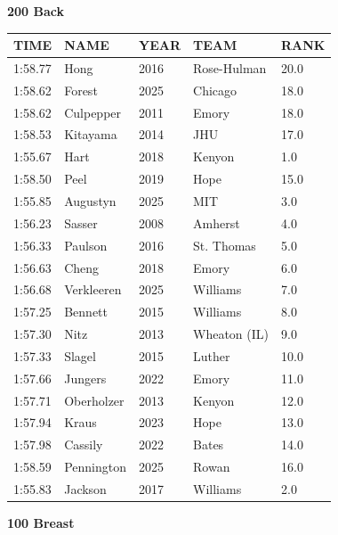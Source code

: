 \begin{table}[H]
\centering
\begin{minipage}[t]{0.48\textwidth}
\centering
\textbf{200 Back}\\[0.1cm]
\begin{tabular}{@{}p{1.8cm}p{2.8cm}p{1.2cm}p{1.4cm}p{0.8cm}@{}}
\hline
    \textbf{TIME} & \textbf{NAME} & \textbf{YEAR} & \textbf{TEAM} & \textbf{RANK} \\
\hline
    1:58.77 & Hong & 2016 & Rose-Hulman & 20.0 \\
    1:58.62 & Forest & 2025 & Chicago & 18.0 \\
    1:58.62 & Culpepper & 2011 & Emory & 18.0 \\
    1:58.53 & Kitayama & 2014 & JHU & 17.0 \\
    1:55.67 & Hart & 2018 & Kenyon & 1.0 \\
    1:58.50 & Peel & 2019 & Hope & 15.0 \\
    1:55.85 & Augustyn & 2025 & MIT & 3.0 \\
    1:56.23 & Sasser & 2008 & Amherst & 4.0 \\
    1:56.33 & Paulson & 2016 & St. Thomas & 5.0 \\
    1:56.63 & Cheng & 2018 & Emory & 6.0 \\
    1:56.68 & Verkleeren & 2025 & Williams & 7.0 \\
    1:57.25 & Bennett & 2015 & Williams & 8.0 \\
    1:57.30 & Nitz & 2013 & Wheaton (IL) & 9.0 \\
    1:57.33 & Slagel & 2015 & Luther & 10.0 \\
    1:57.66 & Jungers & 2022 & Emory & 11.0 \\
    1:57.71 & Oberholzer & 2013 & Kenyon & 12.0 \\
    1:57.94 & Kraus & 2023 & Hope & 13.0 \\
    1:57.98 & Cassily & 2022 & Bates & 14.0 \\
    1:58.59 & Pennington & 2025 & Rowan & 16.0 \\
    1:55.83 & Jackson & 2017 & Williams & 2.0 \\
\hline
\end{tabular}
\end{minipage}\hfill
\begin{minipage}[t]{0.48\textwidth}
\centering
\textbf{100 Breast}\\[0.1cm]
\begin{tabular}{@{}p{1.8cm}p{2.8cm}p{1.2cm}p{1.4cm}p{0.8cm}@{}}

\end{tabular}
\end{minipage}
\end{table}
